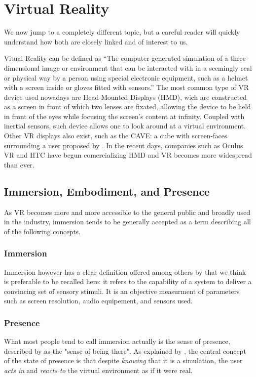 \section{Virtual Reality}

We now jump to a completely different topic, but a careful reader will quickly understand how both are closely linked and of interest to us.

Vitual Reality can be defined as ``The computer-generated simulation of a three-dimensional image or environment that can be interacted with in a seemingly real or physical way by a person using special electronic equipment, such as a helmet with a screen inside or gloves fitted with sensors.'' \cite{oxford2015} The most common type of VR device used nowadays are Head-Mounted Displays (HMD), wich are constructed as a screen in front of which two lenses are fixated, allowing the device to be held in front of the eyes while focusing the screen's content at infinity. Coupled with inertial sensors, such device allows one to look around at a virtual environment. Other VR displays also exist, such as the CAVE: a cube with screen-faces surrounding a user proposed by \cite{cruz1992cave}. In the recent days, companies such as Oculus VR and HTC have begun comercializing HMD and VR becomes more widespread than ever.

\subsection{Immersion, Embodiment, and Presence}
As VR becomes more and more accessible to the general public and broadly used in the industry, immersion tends to be generally accepted as a term describing all of the following concepts.

\subsubsection{Immersion}
Immersion however has a clear definition offered among others by \cite{slater2003note,sanchez2005presence} that we think is preferable to be recalled here: it refers to the capability of a system to deliver a convincing set of sensory stimuli. It is an objective measurment of parameters such as screen resolution, audio equipement, and sensors used.

\subsubsection{Presence}
What most people tend to call immersion actually is the sense of presence, described by \cite{held1992telepresence,slater1993representations} as the "sense of being there". As explained by \cite{debarba2017embodiment}, the central concept of the state of presence is that despite \textit{knowing} that it is a simulation, the user \textit{acts in} and \textit{reacts to} the virtual environment as if it were real.

